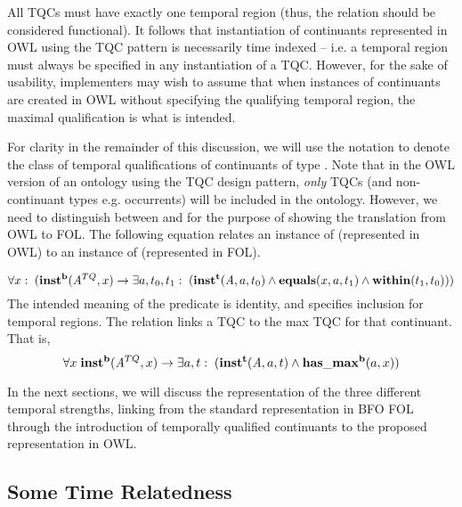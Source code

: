 All TQCs must have exactly one temporal region (thus, the  relation should be
considered functional). It follows that instantiation of continuants represented in OWL using 
the TQC pattern is necessarily time indexed -- i.e. a temporal region must always be specified 
in any instantiation of a TQC. However, for the sake of usability, implementers may wish to assume  
that when instances of continuants are created in OWL without specifying the qualifying temporal region, the maximal qualification is what is intended. 

For clarity in the remainder of this discussion, we will use the notation  to denote the class of temporal qualifications of
continuants of type . Note that in the OWL version of an ontology using the TQC design pattern, \emph{only} TQCs (and non-continuant types e.g. occurrents) will be included in the ontology. However, we need to distinguish between  and  for the purpose of showing the translation from OWL to FOL. The following equation relates an instance of  (represented in OWL) to an instance of  (represented in FOL). 

\begin{equation}
\forall x:\; (\mathrm{\mathbf{inst^b}}(\mathit{A}^{TQ},x) \rightarrow \exists a,t_0,t_1:\;(
\mathrm{\mathbf{inst^t}}(\mathit{A},a,t_0) \wedge \mathrm{\mathbf{equals}}(x,a,t_1) \wedge
\mathrm{\mathbf{within}}(t_1,t_0)))
\end{equation}
The intended meaning of the predicate  is identity, and  specifies inclusion for temporal regions.  
The relation  links a TQC to the max TQC for that continuant. That is,
\begin{equation}
\forall x\; \mathrm{\mathbf{inst^b}}(\mathit{A}^{TQ},x) \rightarrow \exists a,t:\;(
\mathrm{\mathbf{inst^t}}(\mathit{A}, a,t) \wedge \mathrm{\mathbf{has\_max^b}}(a,x))
\end{equation}

In the next sections, we will discuss the representation of the three different
temporal strengths, linking from the standard representation in BFO FOL through
the introduction of temporally qualified continuants to the proposed
representation in OWL.

\subsection*{Some Time Relatedness}

